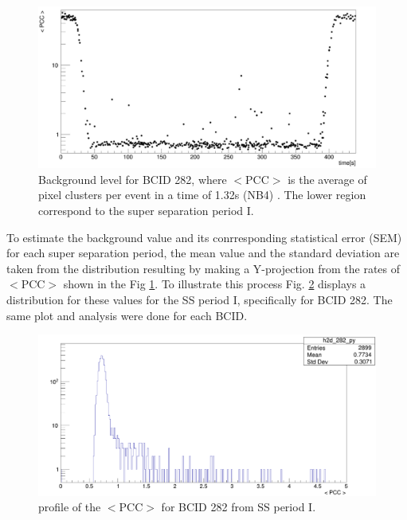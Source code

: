 \begin{center}
\begin{figure}[h!]
\centering
\includegraphics[width=.80\textwidth]{Chapter4/BX_282_Rates_SS1.png}
\caption[Super Separation period I for BCID 282]{Background  level for BCID 282, where $<\text{PCC}>$ is the average of pixel clusters per event in a time of 1.32s (NB4)  . The lower region correspond to the super separation period I.}
\label{ssp_wide_bx282}
\end{figure}
\end{center}

To estimate the background value and its conrresponding statistical error (SEM) for each super separation period, the mean value and the standard deviation are taken from the distribution resulting  by making a Y-projection from the rates of $<\text{PCC}>$ shown in the Fig \ref{ssp_wide_bx282}. 
To illustrate this process Fig. \ref{ss1_hist_282} displays a distribution for these values for the SS period I, specifically for BCID 282. The same plot and analysis were done  for each BCID.\\

\begin{center}
  \begin{figure}[h!]
    \centering
    \includegraphics[scale=.27]{Chapter4/ss1_histo_bx282.png}
    \caption[$<\text{PCC}>$ profile for BCID 282 from SS period I]{profile of the $<\text{PCC}>$  for BCID 282 from SS period I.} 
    \label{ss1_hist_282}
  \end{figure}
\end{center}


